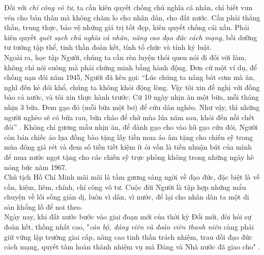 Đối với \textit{chí công vô tư}, ta cần kiên quyết chống chủ nghĩa cá nhân, chỉ biết vun vén cho bản thân mà không chăm lo cho nhân dân, cho đất nước. Cần phải thẳng thắn, trung thực, bảo vệ những giá trị tốt đẹp, kiên quyết chống cái xấu. Phải kiên quyết \textit{quét sạch chủ nghĩa cá nhân, nâng cao đạo đức cách mạng}, bồi dưỡng tư tưởng tập thể, tinh thần đoàn kết, tính tổ chức và tính kỷ luật. \citep{nangcao}\\
Ngoài ra, học tập Người, chúng ta cần rèn luyện thói quen nói đi đôi với làm, không chỉ nói suông mà phải chứng minh bằng hành động. Đơn cử một ví dụ, để chống nạn đói năm 1945, Người đã kêu gọi: “Lúc chúng ta nâng bát cơm mà ăn, nghĩ đến kẻ đói khổ, chúng ta không khỏi động lòng. Vậy tôi xin đề nghị với đồng bào cả nước, và tôi xin thực hành trước: Cứ 10 ngày nhịn ăn một bữa, mỗi tháng nhịn 3 bữa. Đem gạo đó (mỗi bữa một bơ) để cứu dân nghèo. Như vậy, thì những người nghèo sẽ có bữa rau, bữa cháo để chờ mùa lúa năm sau, khỏi đến nỗi chết đói” \cite{HCMtt4}. Không chỉ gương mẫu nhịn ăn, để dành gạo cho vào hũ gạo cứu đói, Người còn bán chiếc áo lụa đồng bào tặng lấy tiền mua áo ấm tặng cho chiến sỹ trong mùa đông giá rét và đem số tiền tiết kiệm ít ỏi vốn là tiền nhuận bút của mình để mua nước ngọt tặng cho các chiến sỹ trực phòng không trong những ngày hè nóng bức năm 1967. \cite{Mai2019}\\
Chủ tịch Hồ Chí Minh mãi mãi là tấm gương sáng ngời về đạo đức, đặc biệt là về cần, kiệm, liêm, chính, chí công vô tư. Cuộc đời Người là tập hợp những mẩu chuyện về lối sống giản dị, luôn vì dân, vì nước, để lại cho nhân dân ta một di sản khổng lồ để noi theo.\\
Ngày nay, khi đất nước bước vào giai đoạn mới của thời kỳ Đổi mới, đòi hỏi sự đoàn kết, thống nhất cao, "\textit{cán bộ, đảng viên và đoàn viên thanh niên} càng phải giữ vững lập trường giai cấp, nâng cao tinh thần trách nhiệm, trau dồi đạo đức cách mạng, quyết tâm hoàn thành nhiệm vụ mà Đảng và Nhà nước đã giao cho" \cite{doanket}.